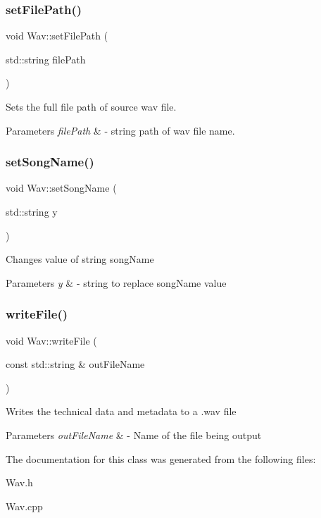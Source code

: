 \subsubsection{\texorpdfstring{set\+File\+Path()}{setFilePath()}}
{\footnotesize\ttfamily void Wav\+::set\+File\+Path (\begin{DoxyParamCaption}\item[{std\+::string}]{file\+Path }\end{DoxyParamCaption})}

Sets the full file path of source wav file. 
\begin{DoxyParams}{Parameters}
{\em file\+Path} & -\/ string path of wav file name. \\
\hline
\end{DoxyParams}
\mbox{\label{classWav_a129cd26f79a06e932e5cefda0ecdb35a}} 
\subsubsection{\texorpdfstring{set\+Song\+Name()}{setSongName()}}
{\footnotesize\ttfamily void Wav\+::set\+Song\+Name (\begin{DoxyParamCaption}\item[{std\+::string}]{y }\end{DoxyParamCaption})}

Changes value of string song\+Name 
\begin{DoxyParams}{Parameters}
{\em y} & -\/ string to replace song\+Name value \\
\hline
\end{DoxyParams}
\mbox{\label{classWav_ad86f4a21d36719ae375ea2586f9f591f}} 
\subsubsection{\texorpdfstring{write\+File()}{writeFile()}}
{\footnotesize\ttfamily void Wav\+::write\+File (\begin{DoxyParamCaption}\item[{const std\+::string \&}]{out\+File\+Name }\end{DoxyParamCaption})}

Writes the technical data and metadata to a .wav file 
\begin{DoxyParams}{Parameters}
{\em out\+File\+Name} & -\/ Name of the file being output \\
\hline
\end{DoxyParams}


The documentation for this class was generated from the following files\+:\begin{DoxyCompactItemize}
\item 
Wav.\+h\item 
Wav.\+cpp\end{DoxyCompactItemize}
